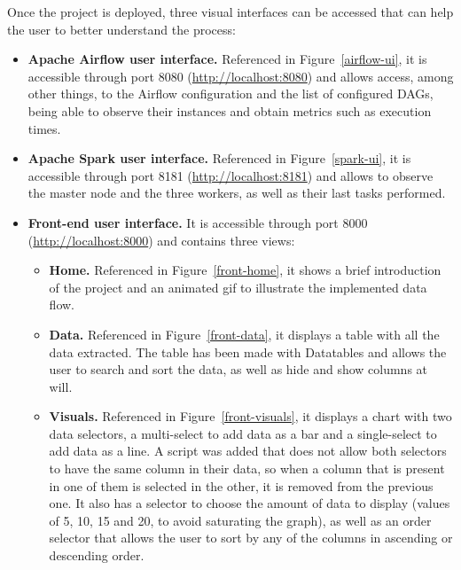 \nonzeroparskip Once the project is deployed, three visual interfaces can be accessed that can help the user to better understand the process:
\begin{itemize}
	 \item \textbf{Apache Airflow user interface.} Referenced in Figure~\ref{airflow-ui}, it is accessible through port 8080 (\url{http://localhost:8080}) and allows access, among other things, to the Airflow configuration and the list of configured DAGs, being able to observe their instances and obtain metrics such as execution times.
	 \item \textbf{Apache Spark user interface.} Referenced in Figure~\ref{spark-ui}, it is accessible through port 8181 (\url{http://localhost:8181}) and allows to observe the master node and the three workers, as well as their last tasks performed.
	 \item \textbf{Front-end user interface.} It is accessible through port 8000 (\url{http://localhost:8000}) and contains three views:
	 \begin{itemize}
	 	\item \textbf{Home.} Referenced in Figure~\ref{front-home}, it shows a brief introduction of the project and an animated gif to illustrate the implemented data flow.
	 	\item \textbf{Data.} Referenced in Figure~\ref{front-data}, it displays a table with all the data extracted. The table has been made with Datatables and allows the user to search and sort the data, as well as hide and show columns at will.
	 	\item \textbf{Visuals.} Referenced in Figure~\ref{front-visuals}, it displays a chart with two data selectors, a multi-select to add data as a bar and a single-select to add data as a line. A script was added that does not allow both selectors to have the same column in their data, so when a column that is present in one of them is selected in the other, it is removed from the previous one. It also has a selector to choose the amount of data to display (values of 5, 10, 15 and 20, to avoid saturating the graph), as well as an order selector that allows the user to sort by any of the columns in ascending or descending order.
	 \end{itemize}
\end{itemize}



